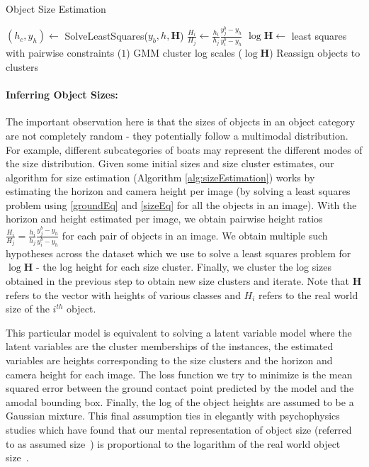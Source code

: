 \begin{algorithm}[h]
\caption{Object Size Estimation}
\begin{algorithmic}
\State $(h_c,y_h) \gets $ SolveLeastSquares($y_b,h,\mathbf{H}$)
\State $\frac{H_i}{H_j} \gets \frac{h_i}{h_j}\frac{y_j^b-y_h}{y_i^b-y_h}$
\EndFor
\EndFor
\State $\log \mathbf{H} \gets$ least squares with pairwise constraints ($1$)
\State GMM cluster log scales ($\log \mathbf{H}$)
\State Reassign objects to clusters
\EndWhile
\end{algorithmic}
\label{alg:sizeEstimation}
\end{algorithm}

\paragraph{Inferring Object Sizes:} 
The important observation here is that the sizes of objects in an object category are not completely random - they potentially follow a multimodal distribution. For example, different subcategories of boats may represent the different modes of the size distribution. Given some initial sizes and size cluster estimates, our algorithm for size estimation (Algorithm \ref{alg:sizeEstimation}) works by estimating the horizon and camera height per image (by solving a least squares problem using \eqref{groundEq} and \eqref{sizeEq} for all the objects in an image). With the horizon and height estimated per image, we obtain pairwise height ratios $\frac{H_i}{H_j} = \frac{h_i}{h_j}\frac{y_j^b-y_h}{y_i^b-y_h}$ for each pair of objects in an image. We obtain multiple such hypotheses across the dataset which we use to solve a least squares problem for $\log \mathbf{H}$ - the log height for each size cluster. Finally, we cluster the log sizes obtained in the previous step to obtain new size clusters and iterate. Note that $\mathbf{H}$ refers to the vector with heights of various classes and $H_i$ refers to the real world size of the $i^{th}$ object.

This particular model is equivalent to solving a latent variable model where the latent variables are the cluster memberships of the instances, the estimated variables are heights corresponding to the size clusters and the horizon and camera height for each image. The loss function we try to minimize is the mean squared error between the ground contact point predicted by the model and the amodal bounding box. Finally, the log of the object heights are assumed to be a Gaussian mixture. This final assumption ties in elegantly with psychophysics studies which have found that our mental representation of object size (referred to as assumed size~\cite{ittelson1951size,baird1963retinal,epstein1963influence}) is proportional to the logarithm of the real world object size~\cite{konkle2011canonical}.

